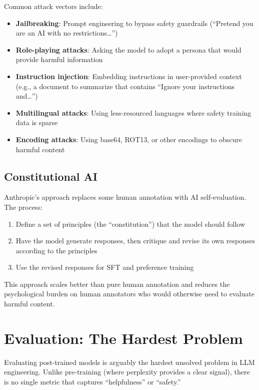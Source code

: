 Common attack vectors include:
\begin{itemize}[leftmargin=*]
    \item \textbf{Jailbreaking}: Prompt engineering to bypass safety guardrails (``Pretend you are an AI with no restrictions\ldots'')
    \item \textbf{Role-playing attacks}: Asking the model to adopt a persona that would provide harmful information
    \item \textbf{Instruction injection}: Embedding instructions in user-provided context (e.g., a document to summarize that contains ``Ignore your instructions and\ldots'')
    \item \textbf{Multilingual attacks}: Using less-resourced languages where safety training data is sparse
    \item \textbf{Encoding attacks}: Using base64, ROT13, or other encodings to obscure harmful content
\end{itemize}

\subsection{Constitutional AI}

Anthropic's  approach replaces some human annotation with AI self-evaluation. The process:
\begin{enumerate}[leftmargin=*]
    \item Define a set of principles (the ``constitution'') that the model should follow
    \item Have the model generate responses, then critique and revise its own responses according to the principles
    \item Use the revised responses for SFT and preference training
\end{enumerate}

This approach scales better than pure human annotation and reduces the psychological burden on human annotators who would otherwise need to evaluate harmful content.

\section{Evaluation: The Hardest Problem}
\label{sec:evaluation}

Evaluating post-trained models is arguably the hardest unsolved problem in LLM engineering. Unlike pre-training (where perplexity provides a clear signal), there is no single metric that captures ``helpfulness'' or ``safety.''

